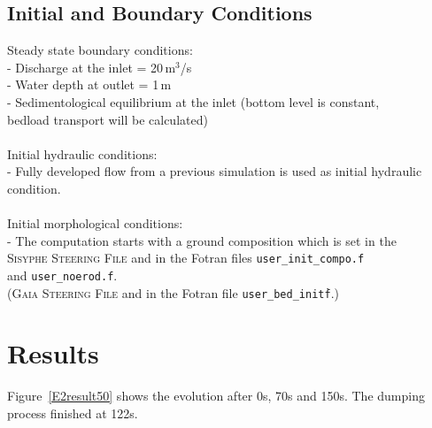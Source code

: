 \subsection{Initial and Boundary Conditions}
%
Steady state boundary conditions:\\
\hspace*{3mm} - Discharge at the inlet = 20\,m$^3$/s\\
\hspace*{3mm} - Water depth at outlet = 1\,m\\
\hspace*{3mm} - Sedimentological equilibrium at the inlet (bottom level is constant,\\
\hspace*{5.3mm} bedload transport will be calculated)\\
\\
Initial hydraulic conditions:\\
\hspace*{3mm} - Fully developed flow from a previous simulation is used as initial hydraulic condition.\\
\\
Initial morphological conditions:\\
\hspace*{3mm} - The computation starts with a ground composition which is set in the \\
\hspace*{5.3mm} \textsc{Sisyphe Steering File} and in the Fotran files \texttt{user\_init\_compo.f}\\
\hspace*{5.3mm} and \texttt{user\_noerod.f}.\\
\hspace*{5.3mm} (\textsc{Gaia Steering File} and in the Fotran file \texttt{user\_bed\_init\.f}.)\\


\newpage
\section{Results}
%
Figure~\ref{E2result50} shows the evolution after 0s, 70s and 150s. The dumping process finished at 122s.


